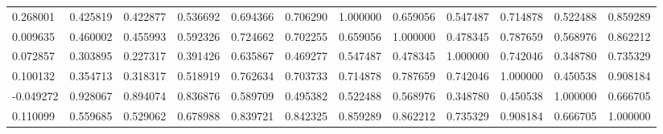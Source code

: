 \begin{table}
\begin{tabular}{lcr}
0.268001 & 0.425819 & 0.422877 & 0.536692 & 0.694366 & 0.706290 & 1.000000 & 0.659056 & 0.547487 & 0.714878 & 0.522488 & 0.859289 \\
0.009635 & 0.460002 & 0.455993 & 0.592326 & 0.724662 & 0.702255 & 0.659056 & 1.000000 & 0.478345 & 0.787659 & 0.568976 & 0.862212 \\
0.072857 & 0.303895 & 0.227317 & 0.391426 & 0.635867 & 0.469277 & 0.547487 & 0.478345 & 1.000000 & 0.742046 & 0.348780 & 0.735329 \\
0.100132 & 0.354713 & 0.318317 & 0.518919 & 0.762634 & 0.703733 & 0.714878 & 0.787659 & 0.742046 & 1.000000 & 0.450538 & 0.908184 \\
-0.049272 & 0.928067 & 0.894074 & 0.836876 & 0.589709 & 0.495382 & 0.522488 & 0.568976 & 0.348780 & 0.450538 & 1.000000 & 0.666705 \\
0.110099 & 0.559685 & 0.529062 & 0.678988 & 0.839721 & 0.842325 & 0.859289 & 0.862212 & 0.735329 & 0.908184 & 0.666705 & 1.000000 \\
\bottomrule
\end{tabular}
\end{table}

